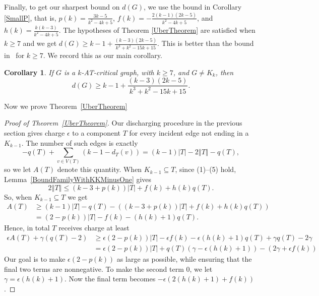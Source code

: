 \documentclass[12pt]{article}
\theoremstyle{plain}
\newtheorem{cor}[thm]{Corollary}
\theoremstyle{definition}
\theoremstyle{remark}
\newcommand{\set}[1]{\left\{ #1 \right\}}
\newcommand{\card}[1]{\left|#1\right|}
\newcommand{\size}[1]{\left\Vert#1\right\Vert}
\newcommand{\parens}[1]{\left( #1 \right)}
\begin{document}
Finally, to get our sharpest bound on $d(G)$, we use the bound in Corollary \ref{SmallP}, that is, $p(k) = \frac{3k-5}{k^2 - 4k + 5}$, $f(k) = -\frac{2(k-1)(2k-5)}{k^2 - 4k + 5}$, and $h(k) = \frac{k(k-3)}{k^2 - 4k + 5}$.  The hypotheses of Theorem \ref{UberTheorem} are satisfied when $k\ge7$ and we get $d(G) \ge k-1 + \frac{(k-3)(2k-5)}{k^3 + k^2 - 15k + 15}.$
 This is better than the bound in~\cite{OreVizing} for $k \ge 7$.  We record this as our main corollary.

\begin{cor}\label{MainCor}
If $G$ is a $k$-AT-critical graph, with $k\ge 7$, and $G\ne K_k$, then
 \[d(G) \ge k-1 + \frac{(k-3)(2k-5)}{k^3 + k^2 - 15k + 15}.\]
\end{cor}

Now we prove Theorem~\ref{UberTheorem}
\begin{proof}[Proof of Theorem~\ref{UberTheorem}]
Our discharging procedure in the previous section gives charge $\epsilon$ to a component $T$ for every incident edge not ending in a $K_{k-1}$.  The number of such edges is exactly
%
\[-q(T) + \sum_{v \in V(T)} (k-1 - d_T(v)) = (k-1)\card{T} - 2\size{T} - q(T),\]
%
so we let $A(T)$ denote this quantity.  When $K_{k-1} \subseteq T$, since
(1)--(5) hold, Lemma~\ref{BoundFamilyWithKKMinusOne} gives
%
\[2\size{T} \le (k-3 + p(k))\card{T} + f(k) + h(k)q(T).\]
%
So, when $K_{k-1} \subseteq T$ we get
%
\begin{align*}
    A(T) & \ge (k-1)\card{T} - q(T) - ((k-3 + p(k))\card{T} + f(k) + h(k)q(T))\\
         &  =(2-p(k))\card{T} - f(k) - (h(k) + 1)q(T).
\end{align*}
Hence, in total $T$ receives charge at least
\begin{align*}
    \epsilon A(T) + \gamma(q(T) - 2) &\ge \epsilon(2-p(k))|T| - \epsilon f(k) - \epsilon (h(k)+1)q(T) +\gamma q(T)-2\gamma \\
    & = \epsilon(2-p(k))|T| + q(T)(\gamma - \epsilon (h(k)+1)) - (2\gamma + \epsilon f(k))
\end{align*}
%
Our goal is to make $\epsilon(2-p(k))$ as large as possible, while ensuring that the final two terms are nonnegative.  To make the second term 0, we let $\gamma = \epsilon(h(k) + 1)$.  Now the final term becomes $-\epsilon(2(h(k)+1)+f(k))$.
%

\end{proof}
\end{document}
